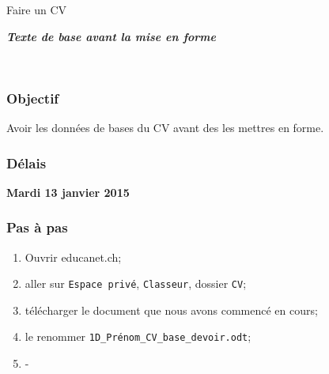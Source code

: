 \documentclass[frenchb]{scrartcl}
\begin{document}
\begin{center}
	{\huge Faire un CV}\par
	\textbf{\textit{Texte de base avant la mise en forme}}
\end{center}\par\noindent\hrulefill{}\\[1em]

\begin{multicols}{2}

\subsubsection*{Objectif}
Avoir les données de bases du CV avant des les mettres en forme.

\subsubsection*{Délais}
\begin{center}
	\large\bfseries
	Mardi 13 janvier 2015
\end{center}

\subsubsection*{Pas à pas}
\begin{enumerate}
	\item Ouvrir educanet.ch;
	\item aller sur \texttt{Espace privé}, \texttt{Classeur}, dossier \texttt{CV};
	\item télécharger le document que nous avons commencé en cours;
	\item le renommer \texttt{1D\_Prénom\_CV\_base\_devoir.odt};
	\item -
\end{enumerate}

\end{multicols}
\end{document}
